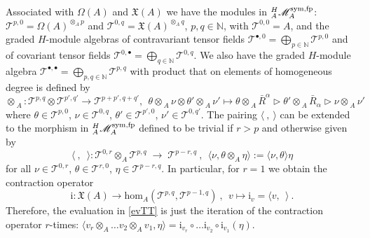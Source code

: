 \documentclass[12pt]{article}
\numberwithin{equation}{section}
\theoremstyle{plain}
\theoremstyle{definition}
\theoremstyle{remark}
\def\Vect{\mathfrak{X}}
\def\MMM{\mathscr{M}}
\def\ra{\triangleright}
\def\Tau{\mathcal T}
\def\le{\langle}
\def\re{\rangle}
\def\TT{{\mathcal T}}
\def\le{\langle}
\def\re{\rangle}
\def\AA{A}
\def\sym{{\rm{sym}}}
\def\ii{\mathrm{i}}
\def\oR{\bar R}
\def\al{\alpha}
\def\catfp{{{}^H_\AA\MMM_\AA^{\sym, \rm{fp}}}}
\def\hom{\mathrm{hom}}
\begin{document}
Associated with  $\Omega(\AA)$ and $\Vect(A)$ we have the modules in
$\catfp$:
$\Tau^{p,0}=\Omega(A)^{\otimes_A p}$
and $\Tau^{0,q}=\Vect(A)^{\otimes_A q}$, $p,q\in
\mathbb{N}$, with $\Tau^{0,0}=A$,  and the
graded $H$-module algebras 
of contravariant tensor fields $\Tau^{\bullet,0}=\bigoplus_{p\in\mathbb{N}} \Tau^{p,0}$ and of covariant tensor
fields  $\Tau^{0,\bullet}=\bigoplus_{q\in \mathbb{N}} \Tau^{0,q}$.
We also have
 the graded $H$-module algebra $\Tau^{\bullet,\bullet}=\bigoplus_{p,q\in\mathbb{N}}
 \Tau^{p,q}$ with product that on elements of homogeneous degree is defined by
 \begin{equation}\label{minT} 
 \otimes_{\!\!\:A} : \Tau^{p,q}\otimes \Tau^{p',q'}\to
 \Tau^{p+p'\!,q+q'}\!,\!~~\theta\otimes_{\!\!\:A}\nu\otimes\theta'\otimes_{\!\!\:A}\nu'\mapsto
 \theta\otimes_{\!\!\:A}\oR^\al \ra \theta'\otimes_{\!\!\:A}
 \oR_\al\ra\nu\otimes_{\!\!\:A}\nu'
 \end{equation}
 where $\theta\in \Tau^{p,0}$, $\nu\in \Tau^{0,q}$,  $\theta'\in
 \Tau^{p',0}$, $\nu'\in \Tau^{0,q'}$.
The pairing $\le~,~\re$ can be extended to the morphism in $\catfp$ defined to be trivial if
$r>p$ and otherwise given by
\begin{equation}\label{evTT}
\le~,~\;\re 
: \TT^{0,r} \otimes_\AA\TT^{p,q}\;\to\;
\TT^{p-r,q}~,~~\le\nu,\theta\otimes_A\eta\re:=\le\nu,\theta\re\eta
\end{equation}
for all $\nu\in \Tau^{0,r}$, $\theta\in \Tau^{r,0}$, $\eta\in
\Tau^{p-r,q}$.
In particular, for $r=1$  we obtain the contraction
operator $$\ii:\Vect(A)\to \hom_A(\TT^{p,q},\TT^{p-1,q})~, ~~v\mapsto
\ii_v=\le v,~~\re~.$$ Therefore, the
evaluation in \eqref{evTT} is just the iteration of the contraction operator 
$r$-times:
$\le v_r\otimes_A\ldots v_2\otimes_A
v_1,\eta\re=
\ii_{v_r}\circ \ldots \ii_{v_2}\circ\ii_{v_1}(\eta)$. 
\\
\end{document}
